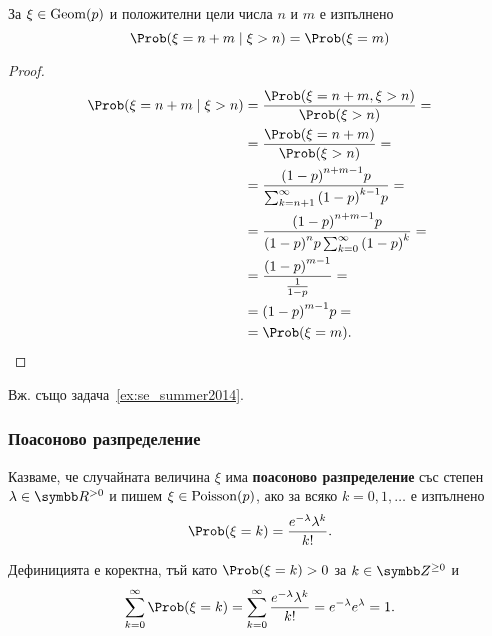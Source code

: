 \documentclass[numbers=endperiod, bibliography=totocnumbered]{scrartcl}
\begin{document}
\begin{theorem}\label{thm:memorylessness}
  За \( \xi \in \operatorname{Geom}(p) \) и положителни цели числа \( n \) и \( m \) е изпълнено
  \begin{equation*}
    \Prob(\xi = n + m \mid \xi > n) = \Prob(\xi = m)
  \end{equation*}
\end{theorem}
\begin{proof}
  \begin{align*}
    \Prob(\xi = n + m \mid \xi > n)
    &=
    \frac {\Prob(\xi = n + m, \xi > n)} {\Prob(\xi > n)}
    = \\ &=
    \frac {\Prob(\xi = n + m)} {\Prob(\xi > n)}
    = \\ &=
    \frac {{(1-p)}^{n+m-1} p} {\sum_{k=n+1}^\infty {(1-p)}^{k-1} p}
    = \\ &=
    \frac {{(1-p)}^{n+m-1} p} {{(1-p)}^n p \sum_{k=0}^\infty {(1-p)}^k}
    = \\ &=
    \frac {{(1-p)}^{m-1}} {\frac 1 {1 - p}}
    = \\ &=
    {(1-p)}^{m-1} p
    = \\ &=
    \Prob(\xi = m).
  \end{align*}
\end{proof}

Вж. също задача~\ref{ex:se_summer2014}.

\subsubsection{Поасоново разпределение}\label{dist:poisson}

\begin{definition}
  Казваме, че случайната величина \( \xi \) има \textbf{поасоново разпределение} със степен \( \lambda \in \RPos \) и пишем \( \xi \in \operatorname{Poisson}(p) \), ако за всяко \( k = 0, 1, \ldots \) е изпълнено
  \begin{equation*}
    \Prob(\xi = k) = \frac{e^{-\lambda} \lambda^k} {k!}.
  \end{equation*}

  Дефиницията е коректна, тъй като \( \Prob(\xi = k) > 0 \) за \( k \in \ZNNeg \) и
  \begin{equation*}
    \sum_{k=0}^\infty \Prob(\xi = k)
    =
    \sum_{k=0}^\infty \frac{e^{-\lambda} \lambda^k} {k!}
    =
    e^{-\lambda} e^{\lambda}
    =
    1.
  \end{equation*}
\end{definition}
\end{document}
